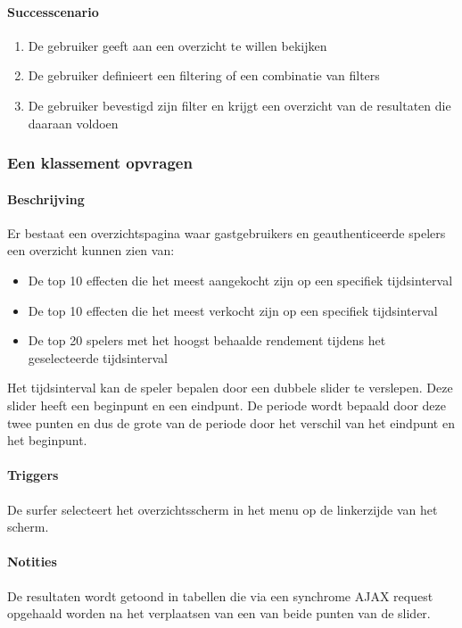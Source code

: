 \paragraph{Successcenario}
\begin{enumerate}
 \item De gebruiker geeft aan een overzicht te willen bekijken
 \item De gebruiker definieert een filtering of een combinatie van filters
 \item De gebruiker bevestigd zijn filter en krijgt een overzicht van de resultaten die daaraan voldoen
\end{enumerate}

\subsubsection{Een klassement opvragen}

\paragraph{Beschrijving} Er bestaat een overzichtspagina waar gastgebruikers en geauthenticeerde spelers een overzicht kunnen zien van:
\begin{itemize}
	\item De top 10 effecten die het meest aangekocht zijn op een specifiek tijdsinterval
  \item De top 10 effecten die het meest verkocht zijn op een specifiek tijdsinterval
  \item De top 20 spelers met het hoogst behaalde rendement tijdens het geselecteerde tijdsinterval
\end{itemize}
Het tijdsinterval kan de speler bepalen door een dubbele slider te verslepen. Deze slider heeft een beginpunt en een eindpunt. De periode wordt bepaald door deze twee punten en dus de grote van de periode door het verschil van het eindpunt en het beginpunt.
\paragraph{Triggers} De surfer selecteert het overzichtsscherm in het menu op de linkerzijde van het scherm.
\paragraph{Notities} De resultaten wordt getoond in tabellen die via een synchrome AJAX request opgehaald worden na het verplaatsen van een van beide punten van de slider.
